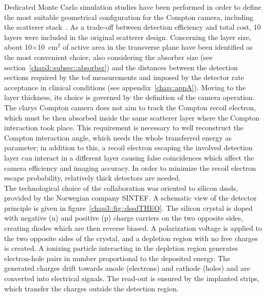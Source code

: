 Dedicated Monte Carlo simulation studies have been performed in order to define the most suitable geometrical configuration for the Compton camera, including the scatterer stack~\parencite{Richard2012}. As a trade-off between detection efficiency and total cost, 10 layers were included in the original scatterer design. Concerning the layer size, about 10$\times$10~cm$^{2}$ of active area in the transverse plane have been identified as the most convenient choice, also considering the absorber size (see section~\ref{chap3::subsec::absorber}) and the distances between the detection sections required by the \gls{tof} measurements and imposed by the detector rate acceptance in clinical conditions (see appendix~\ref{chap::appA}). Moving to the layer thickness, its choice is governed by the definition of the camera operation. The \gls{clarys} Compton camera does not aim to track the Compton recoil electron, which must be then absorbed inside the same scatterer layer where the Compton interaction took place. This requirement is necessary to well reconstruct the Compton interaction angle, which needs the whole transferred energy as parameter; in addition to this, a recoil electron escaping the involved detection layer can interact in a different layer causing false coincidences which affect the camera efficiency and imaging accuracy. In order to minimize the recoil electron escape probability, relatively thick detectors are needed.\\
The technological choice of the collaboration was oriented to silicon \glspl{dssd}, provided by the Norwegian company SINTEF. A schematic view of the detector principle is given in figure~\ref{chap3::fig::dssdTHEO}. The silicon crystal is doped with negative (n) and positive (p) charge carriers on the two opposite sides, creating diodes which are then reverse biased. A polarization voltage is applied to the two opposite sides of the crystal, and a depletion region with no free charges is created. A ionizing particle interacting in the depletion region generates electron-hole pairs in number proportional to the deposited energy. The generated charges drift towards anode (electrons) and cathode (holes) and are converted into electrical signals. The read-out is ensured by the implanted strips, which transfer the charges outside the detection region.\\     

